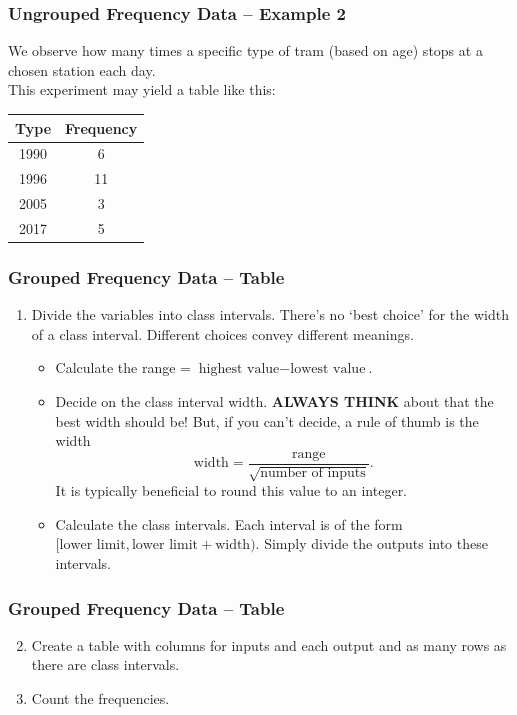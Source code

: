\documentclass[aspectratio=169,11pt,svgnames]{beamer}
\begin{document}
\begin{frame}
 \frametitle{Ungrouped Frequency Data -- Example 2}
 We observe how many times a specific type of tram (based on age) stops at a
 chosen station each day.\\
 \pause
 This experiment may yield a table like this:
 \begin{center}
  \begin{tabular}{c|c}
   \textbf{Type} & \textbf{Frequency}\\
   \toprule
   1990 & 6\\
   1996 & 11\\
   2005 & 3\\
   2017 & 5
  \end{tabular}
 \end{center}
\end{frame}

\begin{frame}
 \frametitle{Grouped Frequency Data -- Table}
 \begin{enumerate}
  \item Divide the variables into \alert{class intervals}. There's no `best
   choice' for the width of a class interval. Different choices convey different
   meanings.
   \pause
   \begin{itemize}
    \item Calculate the \alert{range} = $\text{highest value} - \text{lowest
     value}$.
    \pause
    \item Decide on the \alert{class interval width}. \textbf{ALWAYS THINK}
     about that the best width should be! But, if you can't decide, a rule of
     thumb is the width
     \[
      \text{width} = \frac{\text{range}}{\sqrt{\text{number of inputs}}}.
     \]
     It is typically beneficial to round this value to an integer.
    \pause
    \item Calculate the \alert{class intervals}. Each interval is of the form
     $[\text{lower limit}, \text{lower limit} + \text{width})$. Simply divide
     the outputs into these intervals.
   \end{itemize}
 \end{enumerate}
\end{frame}

\begin{frame}
 \frametitle{Grouped Frequency Data -- Table}
 \begin{enumerate}
  \setcounter{enumi}{1}
  \item Create a \alert{table} with columns for inputs and each output and as
   many rows as there are class intervals.
  \pause
  \item Count the \alert{frequencies}.
 \end{enumerate}
\end{frame}
\end{document}
